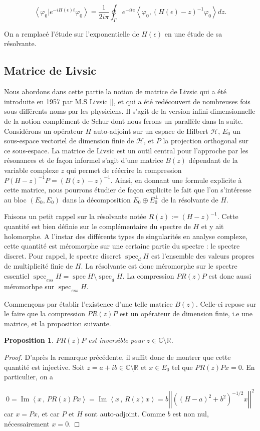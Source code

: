 \documentclass[12pt,openany,a4paper, titlepage]{article}
\newcommand{\f}[2]{\frac{#1}{#2}}
\newcommand{\lp}{\left(}
\newcommand{\rp}{\right)}
\newcommand{\lb}{\left|}
\newcommand{\rb}{\right|}
\newcommand{\la}{\left\langle}
\newcommand{\ra}{\right\rangle}
\newcommand{\R}{\mathbb{R}}
\newcommand{\C}{\mathbb{C}}
\newcommand{\HH}{\mathcal{H}}
\newcommand{\spec}{\operatorname{spec}}
\newcommand{\vp}{\varphi}
\newcommand{\He}{H(\epsilon)}
\newcommand{\inv}{^{-1}}
\newcommand{\im}{\operatorname{Im}}
\newtheorem{prop}{Proposition}
\theoremstyle{definition}
\theoremstyle{definition}
\theoremstyle{definition}
\theoremstyle{definition}
\theoremstyle{definition}
\theoremstyle{definition}
\begin{document}
\begin{equation}
    \la \vp_0 | e^{-i\He t} \vp_0\ra = \f{1}{2i\pi}\oint_\Gamma e^{-itz}\la \varphi_0,\lp H(\epsilon)  -z \rp^{-1} \varphi_0 \ra dz.
\end{equation}

On a remplacé l'étude sur l'exponentielle de $\He$ en une étude de sa résolvante.
\newpage
\subsection{Matrice de Livsic}

Nous abordons dans cette partie la notion de matrice de Livsic qui a été introduite en 1957 par M.S Livsic [], et qui a été redécouvert de nombreuses fois sous différents noms par les physiciens. Il s'agit de la version infini-dimensionnelle de la notion complément de Schur dont nous ferons un parallèle dans la suite. Considérons un opérateur $H$ auto-adjoint sur un espace de Hilbert $\HH$, $E_0$ un sous-espace vectoriel de dimension finie de $\HH$, et $P$ la projection orthogonal sur ce sous-espace. La matrice de Livsic est un outil central pour l'approche par les résonances et de façon informel s'agit d'une matrice $B(z)$ dépendant de la variable complexe $z$ qui permet de réécrire la compression $P(H-z)\inv P = (B(z) -z)\inv$. Ainsi, en donnant une formule explicite à cette matrice, nous pourrons étudier de façon explicite le fait que l'on s'intéresse au bloc $(E_0,E_0)$ dans la décomposition $E_0\oplus E_0^\perp$ de la résolvante de $H$.

Faisons un petit rappel sur la résolvante notée $R(z) := (H-z)\inv$. Cette quantité est bien définie sur le complémentaire du spectre de $H$ et y ait holomorphe. A l'instar des différents types de singularités en analyse complexe, cette quantité est méromorphe sur une certaine partie du spectre : le spectre discret. Pour rappel, le spectre discret $\spec_d H$ est l'ensemble des valeurs propres de multiplicité finie de $H$. La résolvante est donc méromorphe sur le spectre essentiel $\spec_{ess} H = \spec H\setminus\spec_d H$. La compression $PR(z)P$ est donc aussi méromorhpe sur  $\spec_{ess} H$.

Commençons par établir l'existence d'une telle matrice $B(z)$. Celle-ci repose sur le faire que la compression $PR(z)P$ est un opérateur de dimension finie, i.e une matrice, et la proposition suivante.

\begin{prop}
    $PR(z)P$ est inversible pour $z\in\C\setminus\R$.
\end{prop}
\begin{proof}
    D'après la remarque précédente, il suffit donc de montrer que cette quantité est injective. Soit $z = a+ib\in\C\setminus\R$ et $x\in E_0$ tel que $PR(z)Px = 0$. En particulier, on a 

    $$0 = \im\la x\,,\, PR(z)Px \ra = \im\la x\,,\, R(z)x \ra = b\lb\lb\lp (H-a)^2 + b^2 \rp^{-1/2}x\rb\rb^2$$
    car $x = Px$, et car $P$ et $H$ sont auto-adjoint. Comme $b$ est non nul, nécessairement $x = 0$.
\end{proof}
\end{document}
